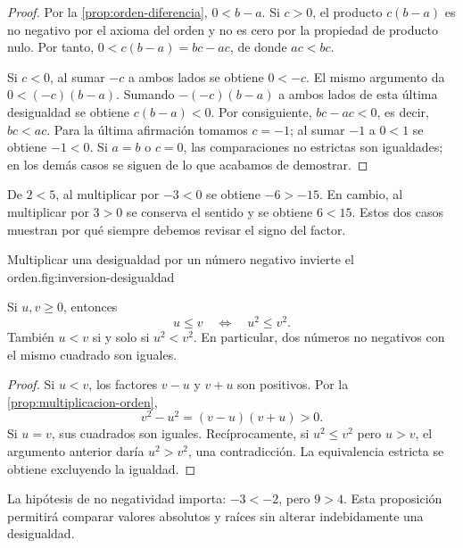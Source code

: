 \begin{proof}
Por la \cref{prop:orden-diferencia}, $0<b-a$. Si $c>0$, el producto $c(b-a)$ es no negativo por el axioma del orden y no es cero por la propiedad de producto nulo. Por tanto, $0<c(b-a)=bc-ac$, de donde $ac<bc$.

Si $c<0$, al sumar $-c$ a ambos lados se obtiene $0<-c$. El mismo argumento da $0<(-c)(b-a)$. Sumando $-(-c)(b-a)$ a ambos lados de esta última desigualdad se obtiene $c(b-a)<0$. Por consiguiente, $bc-ac<0$, es decir, $bc<ac$. Para la última afirmación tomamos $c=-1$; al sumar $-1$ a $0<1$ se obtiene $-1<0$.
Si $a=b$ o $c=0$, las comparaciones no estrictas son igualdades; en los demás casos se siguen de lo que acabamos de demostrar.
\end{proof}

\begin{example}
De $2<5$, al multiplicar por $-3<0$ se obtiene $-6>-15$. En cambio, al multiplicar por $3>0$ se conserva el sentido y se obtiene $6<15$. Estos dos casos muestran por qué siempre debemos revisar el signo del factor.
\end{example}

\begin{figuranotas}{Multiplicar una desigualdad por un número negativo invierte el orden.}{fig:inversion-desigualdad}

\end{figuranotas}

\begin{samepage}
\begin{proposition}
\label{prop:comparacion-cuadrados}
Si $u,v\geq0$, entonces
\[
u\leq v\quad\Longleftrightarrow\quad u^2\leq v^2.
\]
También $u<v$ si y solo si $u^2<v^2$. En particular, dos números no negativos con el mismo cuadrado son iguales.
\end{proposition}
\end{samepage}

\begin{proof}
Si $u<v$, los factores $v-u$ y $v+u$ son positivos. Por la \cref{prop:multiplicacion-orden},
\[
v^2-u^2=(v-u)(v+u)>0.
\]
Si $u=v$, sus cuadrados son iguales. Recíprocamente, si $u^2\leq v^2$ pero $u>v$, el argumento anterior daría $u^2>v^2$, una contradicción. La equivalencia estricta se obtiene excluyendo la igualdad.
\end{proof}

La hipótesis de no negatividad importa: $-3<-2$, pero $9>4$. Esta proposición permitirá comparar valores absolutos y raíces sin alterar indebidamente una desigualdad.


